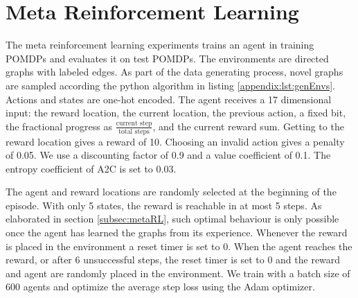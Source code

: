 \documentclass{article} \usepackage{iclr2021_conference,times}
\begin{document}
\newpage
\section{Meta Reinforcement Learning}
\label{appendix:sec:metaRL}
The meta reinforcement learning experiments trains an agent in training POMDPs and evaluates it on test POMDPs.
The environments are directed graphs with labeled edges. 
As part of the data generating process, novel graphs are sampled according the python algorithm in listing \ref{appendix:lst:genEnvs}.
Actions and states are one-hot encoded. The agent receives a 17 dimensional input: the reward location, the current location, the previous action, a fixed bit, the fractional progress as $\frac{\text{current step}}{\text{total steps}}$, and the current reward sum. Getting to the reward location gives a reward of 10. Choosing an invalid action gives a penalty of 0.05. We use a discounting factor of 0.9 and a value coefficient of 0.1. The entropy coefficient of A2C is set to 0.03.

The agent and reward locations are randomly selected at the beginning of the episode. With only 5 states, the reward is reachable in at most 5 steps. As elaborated in section \ref{subsec:metaRL}, such optimal behaviour is only possible once the agent has learned the graphs from its experience. Whenever the reward is placed in the environment a reset timer is set to 0. When the agent reaches the reward, or after 6 unsuccessful steps, the reset timer is set to 0 and the reward and agent are randomly placed in the environment. We train with a batch size of 600 agents and optimize the average step loss using the Adam optimizer.
\end{document}
